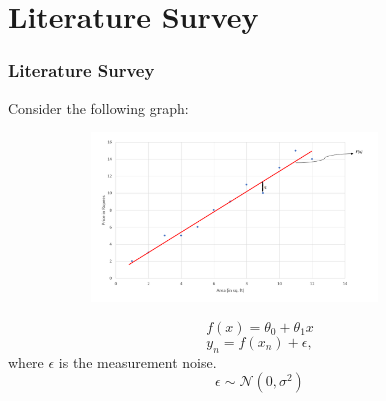 \documentclass[handout,9pt]{beamer}
\numberwithin{theorem}{section}
\begin{document}
\section{Literature Survey}
\begin{frame}
	\begin{spacing}{1}
		\frametitle{Literature Survey}
		Consider the following graph:\\
		\begin{center}
			\includegraphics[width=12cm, height=4.5cm]{graph2}
		\end{center}\pause
		\begin{equation*}
			f(x)=\theta_{0} + \theta_{1}x
		\end{equation*}\pause
	\begin{equation*}
		y_{n}= f(x_{n}) + \epsilon, 
	\end{equation*}
	\hspace{4cm}where $\epsilon$ is the measurement noise.\pause
	\begin{equation*}
		\epsilon \sim \mathcal{N}(0,\sigma^2)
	\end{equation*}
	\end{spacing}
\end{frame}
\end{document}
